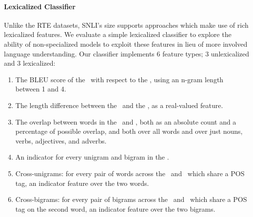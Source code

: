 \paragraph{Lexicalized Classifier}
Unlike the RTE datasets, SNLI's size supports approaches which make use of rich lexicalized features.
We evaluate a simple lexicalized classifier to explore the ability of non-specialized models to exploit these features in lieu of more involved language understanding.
Our classifier implements 6 feature types; 3 unlexicalized and 3 lexicalized:
\begin{enumerate}
\setlength\itemsep{-0.25em}
  \item The BLEU score of the \hypothesis\ with respect
  to the \premise, using an n-gram length between 1 and 4.

  \item The length difference between the \hypothesis\ and the \premise, as a real-valued
  feature.

  \item The overlap between words in the \premise\ and \hypothesis,
  both as an absolute count and a percentage of possible overlap, and both over 
  all words and over just nouns, verbs, adjectives, 
  and adverbs.
  
  \item\label{lst:ngram} An indicator for every unigram and bigram in the \hypothesis.

  \item\label{lst:unigram} Cross-unigrams: for every pair of words across the \premise\ and \hypothesis\ which share a 
  POS tag, an indicator feature over the two words.
  
  \item\label{lst:bigram} Cross-bigrams: for every pair of bigrams across the \premise\ and \hypothesis\ which share a 
  POS tag on the second word, an indicator feature over the two bigrams.
\end{enumerate}

%
%

